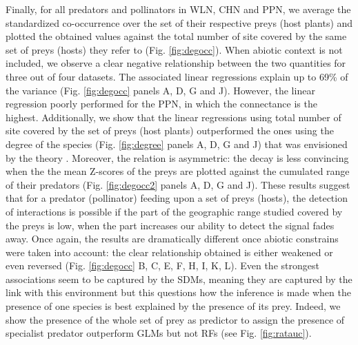 Finally, for all predators and pollinators in WLN, CHN and PPN, we
average the standardized co-occurrence over the set of their respective
preys (host plants) and plotted the obtained values against the total
number of site covered by the same set of preys (hosts) they refer to
(Fig. \ref{fig:degocc}). When abiotic context is not included, we
observe a clear negative relationship between the two quantities for
three out of four datasets. The associated linear regressions explain up
to 69\% of the variance (Fig. \ref{fig:degocc} panels A, D, G and J).
However, the linear regression poorly performed for the PPN, in which
the connectance is the highest. Additionally, we show that the linear
regressions using total number of site covered by the set of preys (host
plants) outperformed the ones using the degree of the species (Fig.
\ref{fig:degree} panels A, D, G and J) that was envisioned by the theory
\citep{Cazelles2016}. Moreover, the relation is asymmetric: the decay is
less convincing when the the mean Z-scores of the preys are plotted
against the cumulated range of their predators (Fig. \ref{fig:degocc2}
panels A, D, G and J). These results suggest that for a predator
(pollinator) feeding upon a set of preys (hosts), the detection of
interactions is possible if the part of the geographic range studied
covered by the preys is low, when the part increases our ability to
detect the signal fades away. Once again, the results are dramatically
different once abiotic constrains were taken into account: the clear
relationship obtained is either weakened or even reversed (Fig.
\ref{fig:degocc} B, C, E, F, H, I, K, L). Even the strongest
associations seem to be captured by the SDMs, meaning they are captured
by the link with this environment but this questions how the inference
is made when the presence of one species is best explained by the
presence of its prey. Indeed, we show the presence of the whole set of
prey as predictor to assign the presence of specialist predator
outperform GLMs but not RFs (see Fig. \ref{fig:ratauc}).

